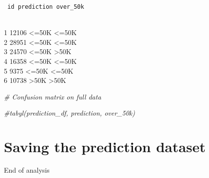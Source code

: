 \documentclass[]{article}
\newenvironment{Shaded}{\begin{snugshade}}{\end{snugshade}}
\newcommand{\CommentTok}[1]{\textcolor[rgb]{0.56,0.35,0.01}{\textit{#1}}}
\newcommand{\KeywordTok}[1]{\textcolor[rgb]{0.13,0.29,0.53}{\textbf{#1}}}
\newcommand{\NormalTok}[1]{#1}
\newcommand{\OperatorTok}[1]{\textcolor[rgb]{0.81,0.36,0.00}{\textbf{#1}}}
\newcommand{\StringTok}[1]{\textcolor[rgb]{0.31,0.60,0.02}{#1}}
\begin{document}
\begin{verbatim}
 id prediction over_50k
\end{verbatim}

\\
1 12106 \textless{}=50K \textless{}=50K\\
2 28951 \textless{}=50K \textless{}=50K\\
3 24570 \textless{}=50K \textgreater{}50K\\
4 16358 \textless{}=50K \textless{}=50K\\
5 9375 \textless{}=50K \textless{}=50K\\
6 10738 \textgreater{}50K \textgreater{}50K

\begin{Shaded}
\begin{Highlighting}[]
\CommentTok{# Confusion matrix on full data}

\CommentTok{#tabyl(prediction_df, prediction, over_50k)}
\end{Highlighting}
\end{Shaded}

\hypertarget{saving-the-prediction-dataset}{%
\section{Saving the prediction
dataset}\label{saving-the-prediction-dataset}}

\begin{Shaded}
\end{Shaded}

End of analysis
\end{document}

